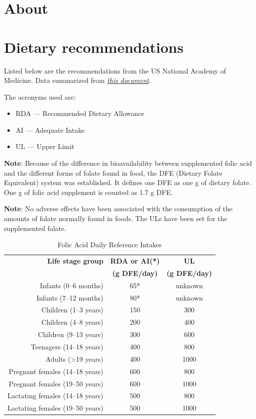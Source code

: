 \documentclass{book}
\begin{document}
\begin{sloppypar}
\section{About}


\section{Dietary recommendations}
Listed below are the recommendations from the US National Academy of Medicine. Data summarized from \href{https://nap.nationalacademies.org/read/6015/chapter/10}{\textit{this document}}.

The acronyms used are:
\begin{itemize}
	\item RDA --- Recommended Dietary Allowance
	\item AI --- Adequate Intake
	\item UL --- Upper Limit
\end{itemize}

\textbf{Note}: Because of the difference in bioavailability between supplemented folic acid and the different forms of folate found in food, the DFE (Dietary Folate Equivalent) system was established. It defines one DFE as one \textmu g of dietary folate. One \textmu g of folic acid supplement is counted as 1.7 \textmu g DFE.

\textbf{Note}: No adverse effects have been associated with the consumption of the amounts of folate normally found in foods. The ULs have been set for the supplemented folate.

\begin{table}[ht]
	\caption{Folic Acid Daily Reference Intakes}
	\centering \begin{tabular}{| r | c | c |}
		\hline
		\textbf{Life stage group} & \textbf{RDA or AI(*)} & \textbf{UL}\\
		& \textbf{(\textmu g DFE/day)} & \textbf{(\textmu g DFE/day)}\\ \hline
		Infants (0--6 months) & 65* & unknown\\ \hline
		Infants (7--12 months) & 80* & unknown\\ \hline
		Children (1--3 years) & 150 & 300\\ \hline
		Children (4--8 years) & 200 & 400\\ \hline
		Children (9--13 years) & 300 & 600\\ \hline
		Teenagers (14--18 years) & 400 & 800\\ \hline
		Adults (\textgreater19 years) & 400 & 1000\\ \hline
		Pregnant females (14--18 years) & 600 & 800\\ \hline
		Pregnant females (19--50 years) & 600 & 1000\\ \hline
		Lactating females (14--18 years) & 500 & 800\\ \hline
		Lactating females (19--50 years) & 500 & 1000\\ \hline
	\end{tabular}
\end{table}
\newpage


\end{sloppypar}
\end{document}
